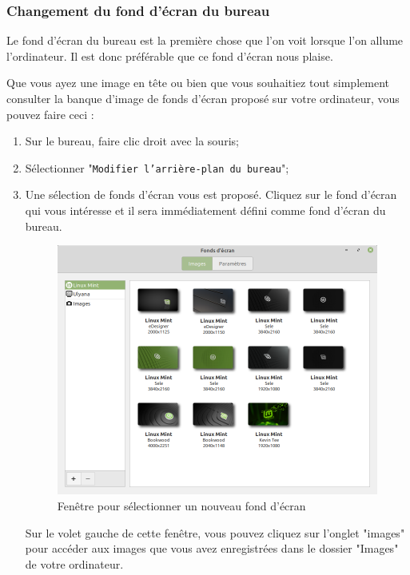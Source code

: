 \documentclass[12pt]{book}
\begin{document}
		\subsubsection{Changement du fond d'écran du bureau}
			Le fond d'écran du bureau est la première chose que l'on voit lorsque l'on allume l'ordinateur.
			Il est donc préférable que ce fond d'écran nous plaise.\par
			Que vous ayez une image en tête ou bien que vous souhaitiez tout simplement consulter la banque d'image de fonds d'écran proposé sur votre ordinateur, vous pouvez faire ceci :
			\begin{enumerate}
				\item Sur le bureau, faire clic droit avec la souris;
				\item Sélectionner "\texttt{Modifier l'arrière-plan du bureau}";
				\item Une sélection de fonds d'écran vous est proposé. Cliquez sur le fond d'écran qui vous intéresse et il sera immédiatement défini comme fond d'écran du bureau.
				\begin{figure}[h]
					\centering
					\includegraphics[width=.8\textwidth]{include/fondsdecran.png}
					\caption{Fenêtre pour sélectionner un nouveau fond d'écran}
					\label{fig:fondsdecran}
				\end{figure}\newline
				Sur le volet gauche de cette fenêtre, vous pouvez cliquez sur l'onglet "images" pour accéder aux images que vous avez enregistrées dans le dossier "Images" de votre ordinateur.
			\end{enumerate}
\end{document}
